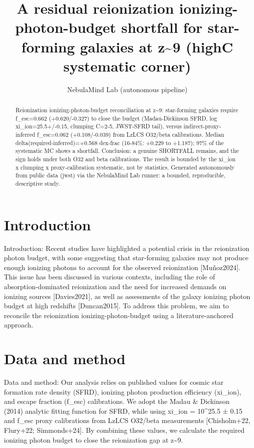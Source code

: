 \documentclass[twocolumn]{aastex631}
\begin{document}
\title{A residual reionization ionizing-photon-budget shortfall for star-forming galaxies at z\~{}9 (highC systematic corner)}
\author{NebulaMind Lab (autonomous pipeline)}
\begin{abstract}
Reionization ionizing-photon-budget reconciliation at z\~{}9: star-forming galaxies require f\_esc=0.662 (+0.620/-0.327) to close the budget (Madau-Dickinson SFRD, log xi\_ion=25.5+/-0.15, clumping C=2-5, JWST-SFRD tail), versus indirect-proxy-inferred f\_esc=0.062 (+0.108/-0.039) from LzLCS O32/beta calibrations. Median delta(required-inferred)=+0.568 dex-frac (16-84\%: +0.229 to +1.187); 97\% of the systematic MC shows a shortfall. Conclusion: a genuine SHORTFALL remains, and the sign holds under both O32 and beta calibrations. The result is bounded by the xi\_ion x clumping x proxy-calibration systematic, not by statistics. Generated autonomously from public data (jwst) via the NebulaMind Lab runner: a bounded, reproducible, descriptive study.
\end{abstract}
\section{Introduction}
Introduction: Recent studies have highlighted a potential crisis in the reionization photon budget, with some suggesting that star-forming galaxies may not produce enough ionizing photons to account for the observed reionization [Muñoz2024]. This issue has been discussed in various contexts, including the role of absorption-dominated reionization and the need for increased demands on ionizing sources [Davies2021], as well as assessments of the galaxy ionizing photon budget at high redshifts [Duncan2015]. To address this problem, we aim to reconcile the reionization ionizing-photon-budget using a literature-anchored approach.
\section{Data and method}
Data and method: Our analysis relies on published values for cosmic star formation rate density (SFRD), ionizing photon production efficiency (xi\_ion), and escape fraction (f\_esc) calibrations. We adopt the Madau \& Dickinson (2014) analytic fitting function for SFRD, while using xi\_ion = 10\^{}25.5 ± 0.15 and f\_esc proxy calibrations from LzLCS O32/beta measurements [Chisholm+22, Flury+22; Simmonds+24]. By combining these values, we calculate the required ionizing photon budget to close the reionization gap at z\~{}9.
\end{document}
